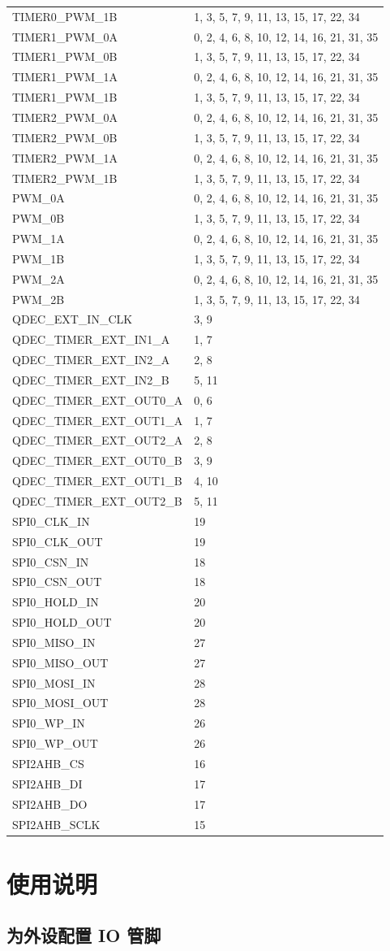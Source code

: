 \documentclass[
  12pt,
]{book}
\begin{document}
\begin{longtable}[]{@{}ll@{}}
TIMER0\_PWM\_1B & 1, 3, 5, 7, 9, 11, 13, 15, 17, 22, 34\tabularnewline
TIMER1\_PWM\_0A & 0, 2, 4, 6, 8, 10, 12, 14, 16, 21, 31, 35\tabularnewline
TIMER1\_PWM\_0B & 1, 3, 5, 7, 9, 11, 13, 15, 17, 22, 34\tabularnewline
TIMER1\_PWM\_1A & 0, 2, 4, 6, 8, 10, 12, 14, 16, 21, 31, 35\tabularnewline
TIMER1\_PWM\_1B & 1, 3, 5, 7, 9, 11, 13, 15, 17, 22, 34\tabularnewline
TIMER2\_PWM\_0A & 0, 2, 4, 6, 8, 10, 12, 14, 16, 21, 31, 35\tabularnewline
TIMER2\_PWM\_0B & 1, 3, 5, 7, 9, 11, 13, 15, 17, 22, 34\tabularnewline
TIMER2\_PWM\_1A & 0, 2, 4, 6, 8, 10, 12, 14, 16, 21, 31, 35\tabularnewline
TIMER2\_PWM\_1B & 1, 3, 5, 7, 9, 11, 13, 15, 17, 22, 34\tabularnewline
PWM\_0A & 0, 2, 4, 6, 8, 10, 12, 14, 16, 21, 31, 35\tabularnewline
PWM\_0B & 1, 3, 5, 7, 9, 11, 13, 15, 17, 22, 34\tabularnewline
PWM\_1A & 0, 2, 4, 6, 8, 10, 12, 14, 16, 21, 31, 35\tabularnewline
PWM\_1B & 1, 3, 5, 7, 9, 11, 13, 15, 17, 22, 34\tabularnewline
PWM\_2A & 0, 2, 4, 6, 8, 10, 12, 14, 16, 21, 31, 35\tabularnewline
PWM\_2B & 1, 3, 5, 7, 9, 11, 13, 15, 17, 22, 34\tabularnewline
QDEC\_EXT\_IN\_CLK & 3, 9\tabularnewline
QDEC\_TIMER\_EXT\_IN1\_A & 1, 7\tabularnewline
QDEC\_TIMER\_EXT\_IN2\_A & 2, 8\tabularnewline
QDEC\_TIMER\_EXT\_IN2\_B & 5, 11\tabularnewline
QDEC\_TIMER\_EXT\_OUT0\_A & 0, 6\tabularnewline
QDEC\_TIMER\_EXT\_OUT1\_A & 1, 7\tabularnewline
QDEC\_TIMER\_EXT\_OUT2\_A & 2, 8\tabularnewline
QDEC\_TIMER\_EXT\_OUT0\_B & 3, 9\tabularnewline
QDEC\_TIMER\_EXT\_OUT1\_B & 4, 10\tabularnewline
QDEC\_TIMER\_EXT\_OUT2\_B & 5, 11\tabularnewline
SPI0\_CLK\_IN & 19\tabularnewline
SPI0\_CLK\_OUT & 19\tabularnewline
SPI0\_CSN\_IN & 18\tabularnewline
SPI0\_CSN\_OUT & 18\tabularnewline
SPI0\_HOLD\_IN & 20\tabularnewline
SPI0\_HOLD\_OUT & 20\tabularnewline
SPI0\_MISO\_IN & 27\tabularnewline
SPI0\_MISO\_OUT & 27\tabularnewline
SPI0\_MOSI\_IN & 28\tabularnewline
SPI0\_MOSI\_OUT & 28\tabularnewline
SPI0\_WP\_IN & 26\tabularnewline
SPI0\_WP\_OUT & 26\tabularnewline
SPI2AHB\_CS & 16\tabularnewline
SPI2AHB\_DI & 17\tabularnewline
SPI2AHB\_DO & 17\tabularnewline
SPI2AHB\_SCLK & 15\tabularnewline
\bottomrule
\end{longtable}

\hypertarget{ux4f7fux7528ux8bf4ux660e-3}{%
\section{使用说明}\label{ux4f7fux7528ux8bf4ux660e-3}}

\hypertarget{ux4e3aux5916ux8bbeux914dux7f6e-io-ux7ba1ux811a}{%
\subsection{为外设配置 IO 管脚}\label{ux4e3aux5916ux8bbeux914dux7f6e-io-ux7ba1ux811a}}
\end{document}
